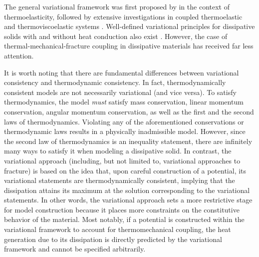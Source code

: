 The general variational framework was first proposed by \citet{biot1956thermoelasticity} in the context of thermoelasticity, followed by extensive investigations in coupled thermoelastic and thermoviscoelastic systems \cite{herrmann1963variational,ben1965variational,oden2012variational,molinari1987global,batra1989principle,matsubara2021variationally}. Well-defined variational principles for dissipative solids with and without heat conduction also exist \cite{ortiz_1999,yang2006variational}. However, the case of thermal-mechanical-fracture coupling in dissipative materials has received far less attention.

It is worth noting that there are fundamental differences between variational consistency and thermodynamic consistency. In fact, thermodynamically consistent models are not necessarily variational (and vice versa). To satisfy thermodynamics, the model \emph{must} satisfy mass conservation, linear momentum conservation, angular momentum conservation, as well as the first and the second laws of thermodynamics. Violating any of the aforementioned conservations or thermodynamic laws results in a physically inadmissible model. However, since the second law of thermodynamics is an inequality statement, there are infinitely many ways to satisfy it when modeling a dissipative solid. In contrast, the variational approach (including, but not limited to, variational approaches to fracture) is based on the idea that, upon careful construction of a potential, its variational statements are thermodynamically consistent, implying that the dissipation attains its maximum at the solution corresponding to the variational statements. In other words, the variational approach sets a more restrictive stage for model construction because it places more constraints on the constitutive behavior of the material. Most notably, if a potential is constructed within the variational framework to account for thermomechanical coupling, the heat generation due to its dissipation is directly predicted by the variational framework and cannot be specified arbitrarily.

